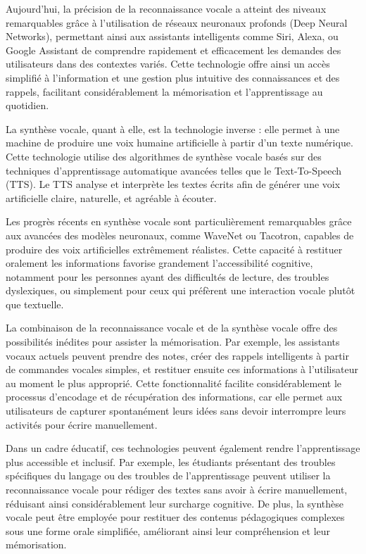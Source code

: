 \documentclass[11pt,a4paper]{report}
\begin{document}
Aujourd’hui, la précision de la reconnaissance vocale a atteint des niveaux remarquables grâce à l’utilisation de réseaux neuronaux profonds (Deep Neural Networks), permettant ainsi aux assistants intelligents comme Siri, Alexa, ou Google Assistant de comprendre rapidement et efficacement les demandes des utilisateurs dans des contextes variés. Cette technologie offre ainsi un accès simplifié à l’information et une gestion plus intuitive des connaissances et des rappels, facilitant considérablement la mémorisation et l’apprentissage au quotidien.

La synthèse vocale, quant à elle, est la technologie inverse : elle permet à une machine de produire une voix humaine artificielle à partir d’un texte numérique. Cette technologie utilise des algorithmes de synthèse vocale basés sur des techniques d’apprentissage automatique avancées telles que le Text-To-Speech (TTS). Le TTS analyse et interprète les textes écrits afin de générer une voix artificielle claire, naturelle, et agréable à écouter.

Les progrès récents en synthèse vocale sont particulièrement remarquables grâce aux avancées des modèles neuronaux, comme WaveNet ou Tacotron, capables de produire des voix artificielles extrêmement réalistes. Cette capacité à restituer oralement les informations favorise grandement l’accessibilité cognitive, notamment pour les personnes ayant des difficultés de lecture, des troubles dyslexiques, ou simplement pour ceux qui préfèrent une interaction vocale plutôt que textuelle.

La combinaison de la reconnaissance vocale et de la synthèse vocale offre des possibilités inédites pour assister la mémorisation. Par exemple, les assistants vocaux actuels peuvent prendre des notes, créer des rappels intelligents à partir de commandes vocales simples, et restituer ensuite ces informations à l’utilisateur au moment le plus approprié. Cette fonctionnalité facilite considérablement le processus d’encodage et de récupération des informations, car elle permet aux utilisateurs de capturer spontanément leurs idées sans devoir interrompre leurs activités pour écrire manuellement.

Dans un cadre éducatif, ces technologies peuvent également rendre l’apprentissage plus accessible et inclusif. Par exemple, les étudiants présentant des troubles spécifiques du langage ou des troubles de l’apprentissage peuvent utiliser la reconnaissance vocale pour rédiger des textes sans avoir à écrire manuellement, réduisant ainsi considérablement leur surcharge cognitive. De plus, la synthèse vocale peut être employée pour restituer des contenus pédagogiques complexes sous une forme orale simplifiée, améliorant ainsi leur compréhension et leur mémorisation.
\end{document}
